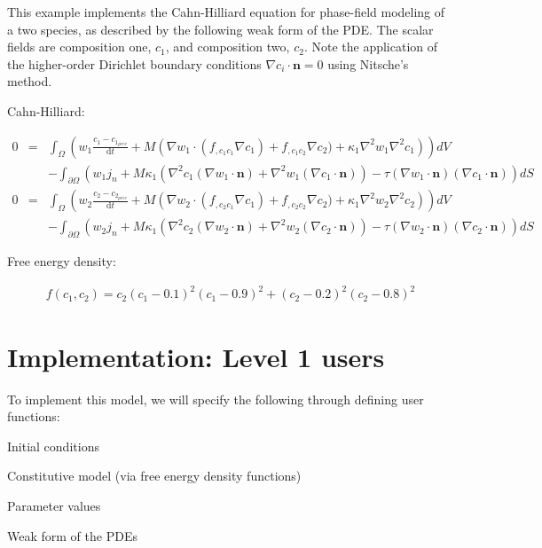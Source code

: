 

This example implements the Cahn-\/\-Hilliard equation for phase-\/field modeling of a two species, as described by the following weak form of the P\-D\-E. The scalar fields are composition one, $c_1$, and composition two, $c_2$. Note the application of the higher-\/order Dirichlet boundary conditions $\nabla c_i\cdot\boldsymbol{n}=0$ using Nitsche's method.

Cahn-\/\-Hilliard\-:

\begin{eqnarray*} 0 &=& \int_\Omega \left(w_1\frac{c_1 - c_{1_{prev}}}{\mathrm{d}t} + M\left(\nabla w_1\cdot(f_{,c_1c_1}\nabla c_1) + f_{,c_1c_2}\nabla c_2) + \kappa_1\nabla^2 w_1\nabla^2 c_1\right)\right) dV\\ &\phantom{=}& - \int_{\partial\Omega} \left(w_1j_n + M\kappa_1\left(\nabla^2c_1(\nabla w_1\cdot\boldsymbol{n}) + \nabla^2w_1(\nabla c_1\cdot\boldsymbol{n})\right) - \tau(\nabla w_1\cdot\boldsymbol{n})(\nabla c_1\cdot\boldsymbol{n})\right) dS\\ 0 &=& \int_\Omega \left(w_2\frac{c_2 - c_{2_{prev}}}{\mathrm{d}t} + M\left(\nabla w_2\cdot(f_{,c_2c_1}\nabla c_1) + f_{,c_2c_2}\nabla c_2) + \kappa_1\nabla^2 w_2\nabla^2 c_2\right)\right) dV\\ &\phantom{=}& - \int_{\partial\Omega} \left(w_2j_n + M\kappa_1\left(\nabla^2c_2(\nabla w_2\cdot\boldsymbol{n}) + \nabla^2w_2(\nabla c_2\cdot\boldsymbol{n})\right) - \tau(\nabla w_2\cdot\boldsymbol{n})(\nabla c_2\cdot\boldsymbol{n})\right) dS \end{eqnarray*}

Free energy density\-:

\begin{eqnarray*} f(c_1,c_2) = c_2(c_1-0.1)^2(c_1-0.9)^2 + (c_2-0.2)^2(c_2-0.8)^2 \end{eqnarray*}

\section*{Implementation\-: Level 1 users }

To implement this model, we will specify the following through defining user functions\-: \par

\begin{DoxyItemize}
\item Initial conditions \par

\item Constitutive model (via free energy density functions) \par

\item Parameter values \par

\item Weak form of the P\-D\-Es \par

\end{DoxyItemize}


